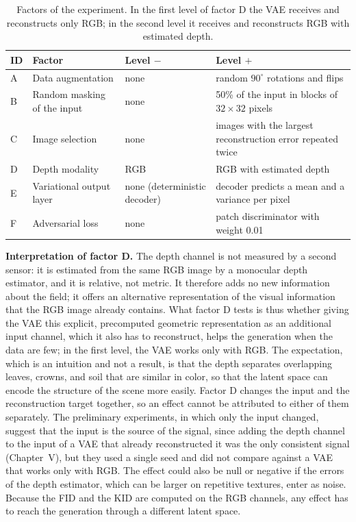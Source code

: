 \begin{table}[H]
\centering
\small
\begin{tabular}{p{}p{}p{}p{}}
\hline
\textbf{ID} & \textbf{Factor} & \textbf{Level $-$} & \textbf{Level $+$} \\
\hline
A & Data augmentation & none & random $90^{\circ}$ rotations and flips \\
B & Random masking of the input & none & 50\% of the input in blocks of $32\times32$ pixels \\
C & Image selection & none & images with the largest reconstruction error repeated twice \\
D & Depth modality & RGB & RGB with estimated depth \\
E & Variational output layer & none (deterministic decoder) & decoder predicts a mean and a variance per pixel \\
F & Adversarial loss & none & patch discriminator with weight 0.01 \\
\hline
\end{tabular}
\caption{Factors of the experiment. In the first level of factor D the VAE receives and reconstructs only RGB; in the second level it receives and reconstructs RGB with estimated depth.}
\label{tab:factors}
\end{table}

\textbf{Interpretation of factor D.} The depth channel is not measured by a second sensor: it is estimated from the same RGB image by a monocular depth estimator, and it is relative, not metric. It therefore adds no new information about the field; it offers an alternative representation of the visual information that the RGB image already contains. What factor D tests is thus whether giving the VAE this explicit, precomputed geometric representation as an additional input channel, which it also has to reconstruct, helps the generation when the data are few; in the first level, the VAE works only with RGB. The expectation, which is an intuition and not a result, is that the depth separates overlapping leaves, crowns, and soil that are similar in color, so that the latent space can encode the structure of the scene more easily. Factor D changes the input and the reconstruction target together, so an effect cannot be attributed to either of them separately. The preliminary experiments, in which only the input changed, suggest that the input is the source of the signal, since adding the depth channel to the input of a VAE that already reconstructed it was the only consistent signal (Chapter~V), but they used a single seed and did not compare against a VAE that works only with RGB. The effect could also be null or negative if the errors of the depth estimator, which can be larger on repetitive textures, enter as noise. Because the FID and the KID are computed on the RGB channels, any effect has to reach the generation through a different latent space.

